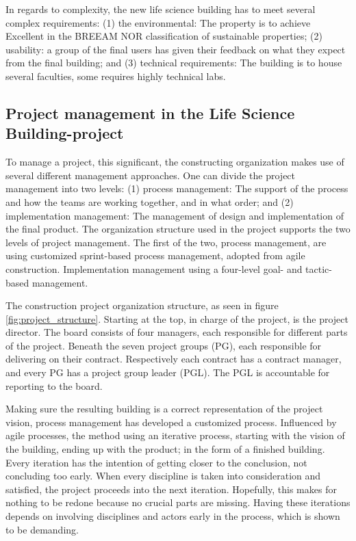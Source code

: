 In regards to complexity, the new life science building has to meet several complex requirements: (1) the environmental: The property is to achieve Excellent in the BREEAM NOR classification of sustainable properties; (2) usability: a group of the final users has given their feedback on what they expect from the final building; and (3) technical requirements: The building is to house several faculties, some requires highly technical labs.


\subsection{Project management in the Life Science Building-project}
To manage a project, this significant, the constructing organization makes use of several different management approaches. One can divide the project management into two levels: (1) process management: The support of the process and how the teams are working together, and in what order; and (2) implementation management: The management of design and implementation of the final product. The organization structure used in the project supports the two levels of project management. The first of the two, process management, are using customized sprint-based process management, adopted from agile construction. Implementation management using a four-level goal- and tactic-based management.  

The construction project organization structure, as seen in figure \ref{fig:project_structure}. Starting at the top, in charge of the project, is the project director. The board consists of four managers, each responsible for different parts of the project. Beneath the seven project groups (PG), each responsible for delivering on their contract. Respectively each contract has a contract manager, and every PG has a project group leader (PGL). The PGL is accountable for reporting to the board.


Making sure the resulting building is a correct representation of the project vision, process management has developed a customized process. Influenced by agile processes, the method using an iterative process, starting with the vision of the building, ending up with the product; in the form of a finished building. Every iteration has the intention of getting closer to the conclusion, not concluding too early. When every discipline is taken into consideration and satisfied, the project proceeds into the next iteration. Hopefully, this makes for nothing to be redone because no crucial parts are missing. Having these iterations depends on involving disciplines and actors early in the process, which is shown to be demanding.


